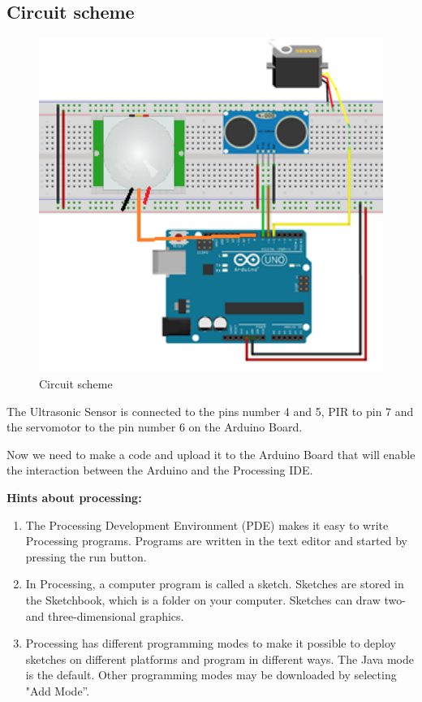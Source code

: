 \subsection{Circuit scheme}

\begin{figure}[H]
	\centering
	\includegraphics[width=14cm]{figures/sonar}
	\caption{Circuit scheme}
	\label{Fig:Scheme}
\end{figure}
The Ultrasonic Sensor is connected to the pins number 4 and 5, PIR to pin 7 and the servomotor to the pin number 6 on the Arduino Board. 

Now we need to make a code and upload it to the Arduino Board that will enable the interaction between the Arduino and the Processing IDE.

\textbf{Hints about processing:}

\begin{enumerate}
\item \textbf{ }The Processing Development Environment (PDE) makes it easy to write Processing programs. Programs are written in the text editor and started by pressing the run button. 

\item  In Processing, a computer program is called a sketch. Sketches are stored in the Sketchbook, which is a folder on your computer. Sketches can draw two- and three-dimensional graphics.

\item  Processing has different programming modes to make it possible to deploy sketches on different platforms and program in different ways. The Java mode is the default. Other programming modes may be downloaded by selecting "Add Mode''.
\end{enumerate}


